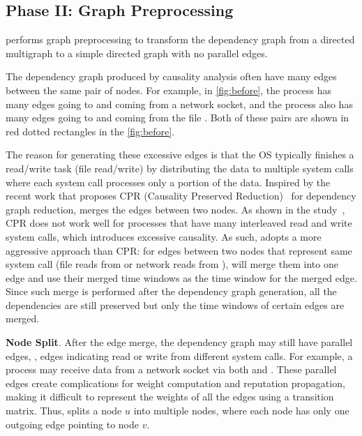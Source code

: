 \subsection{Phase II: Graph Preprocessing}
\label{subsec:graph-preprocessing}

\tool performs graph preprocessing to transform the dependency graph from a directed multigraph to a simple directed graph with no parallel edges.

The dependency graph produced by causality analysis often have many edges between the same pair of nodes.
For example, in \cref{fig:before}, the  process has many edges going to and coming from a network socket, and the  process also has many edges going to and coming from the file .
Both of these pairs are shown in red dotted rectangles in the \cref{fig:before}.

The reason for generating these excessive edges is that the OS typically finishes a read/write task (\eg file read/write) by distributing the data to multiple system calls where each system call processes only a portion of the data.
Inspired by the recent work that proposes CPR (Causality Preserved Reduction)~\cite{reduction} for dependency graph reduction, \tool merges the edges between two nodes.
As shown in the study~\cite{reduction}, CPR does not work well for processes that have many interleaved read and write system calls, which introduces excessive causality.
As such, \tool adopts a more aggressive approach than CPR: for edges between two nodes that represent same system call (\eg file reads from  or network reads from ), \tool will merge them into one edge and use their merged time windows as the time window for the merged edge. 
Since such merge is performed after the dependency graph generation, all the dependencies are still preserved but only the time windows of certain edges are merged. 


\noindent\textbf{Node Split}.
After the edge merge, the dependency graph may still have parallel edges, \ie, edges indicating read or write from different system calls.
For example, a process may receive data from a network socket via both  and .
These parallel edges create complications for weight computation and reputation propagation, making it difficult to represent the weights of all the edges using a transition matrix.
Thus, \tool splits a node $u$ into multiple nodes, where each node has only one outgoing edge pointing to node $v$. 

